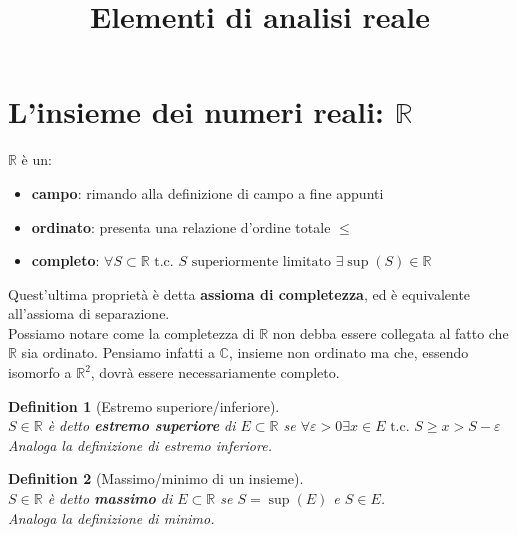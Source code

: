 \documentclass{article}
\newtheorem{definition}{Definition}[section]
\begin{document}
\title{Elementi di analisi reale}
\maketitle
\section{L'insieme dei numeri reali: $\mathbb{R}$}
    $\mathbb{R}$ è un:
    \begin{itemize}
        \item \textbf{campo}: rimando alla definizione di campo a fine appunti
        \item \textbf{ordinato}: presenta una relazione d'ordine totale $\leq$
        \item \textbf{completo}: $\forall S \subset \mathbb{R} \textrm{ t.c. } S 
            \textrm{ superiormente limitato } \exists\sup\left(S\right) \in \mathbb{R}$
    \end{itemize}
    Quest'ultima proprietà è detta \textbf{assioma di completezza}, ed è equivalente 
    all'assioma di separazione. \\
    Possiamo notare come la completezza di $\mathbb{R}$ non debba essere collegata al 
    fatto che $\mathbb{R}$ sia ordinato. Pensiamo infatti a $\mathbb{C}$, insieme non 
    ordinato ma che, essendo isomorfo a $\mathbb{R}^2$, dovrà essere necessariamente completo.
    \begin{definition}[Estremo superiore/inferiore] \, \\
        $S \in \mathbb{R}$ è detto \textbf{estremo superiore} di $E \subset \mathbb{R}$ se  
        $\forall \varepsilon > 0 \exists x \in E \textrm{ t.c. } S \geq x > S - \varepsilon$ \\
        Analoga la definizione di estremo inferiore. 
    \end{definition}
    \begin{definition}[Massimo/minimo di un insieme] \, \\
         $S \in \mathbb{R}$ è detto \textbf{massimo} di $E \subset \mathbb{R}$ se 
        $S = \sup\left(E\right)$ e $S \in E$. \\
        Analoga la definizione di minimo.
    \end{definition}
\end{document}
